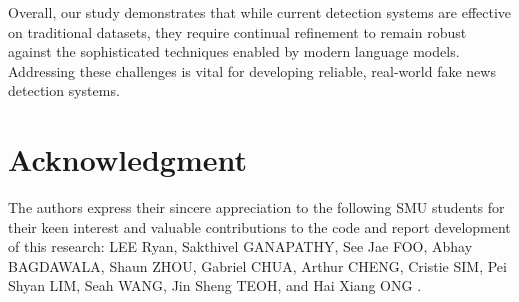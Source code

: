 \documentclass[runningheads]{llncs}
\begin{document}
Overall, our study demonstrates that while current detection systems are effective on traditional datasets, they require continual refinement to remain robust against the sophisticated techniques enabled by modern language models. Addressing these challenges is vital for developing reliable, real-world fake news detection systems.

\section*{Acknowledgment}

The authors express their sincere appreciation to the following SMU students for their keen interest and valuable contributions to the code and report development of this research: LEE Ryan, Sakthivel GANAPATHY, See Jae FOO, Abhay BAGDAWALA, Shaun ZHOU, Gabriel CHUA, Arthur CHENG, 
Cristie SIM,
Pei Shyan LIM, 
Seah WANG,
Jin Sheng TEOH,
and Hai Xiang ONG
.

%


%
\end{document}
